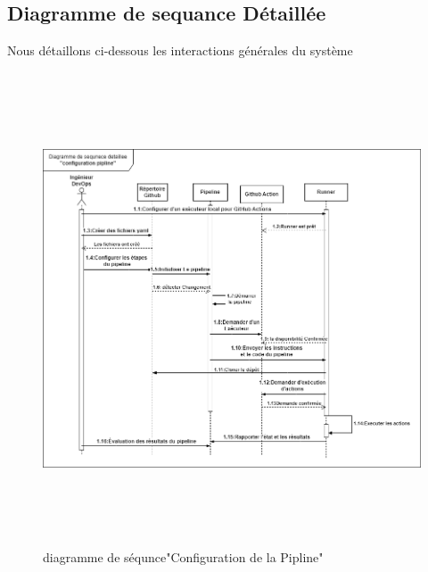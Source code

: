       \subsection{\Large Diagramme de sequance  Détaillée}
       \textsf{\selectfont{}
       Nous détaillons ci-dessous les interactions générales du système}
       \begin{figure}[H]
    \begin{center}
    \includegraphics[height=14cm,width=18cm]{sequencepipeline.drawio}
    \end{center}
    \caption{diagramme de séqunce"Configuration de la Pipline"}
    \end{figure}